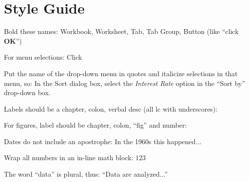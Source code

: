 \section{Style Guide}

Bold these names: Workbook, Worksheet, Tab, Tab Group, Button (like ``click \textbf{OK}'') 

For menu selections: Click \textsc{}

Put the name of the drop-down menu in quotes and italicize selections in that menu, so: In the Sort dialog box, select the \textit{Interest Rate} option in the ``Sort by'' drop-down box.

Labels should be a chapter, colon, verbal desc (all lc with underscores): \label{03:title}

For figures, label should be chapter, colon, ``fig'' and number: \label{03:fig01}

Dates do not include an apostrophe: In the 1960s this happened...

Wrap all numbers in an in-line math block: $ 123 $

The word ``data'' is plural, thus: ``Data are analyzed...''

